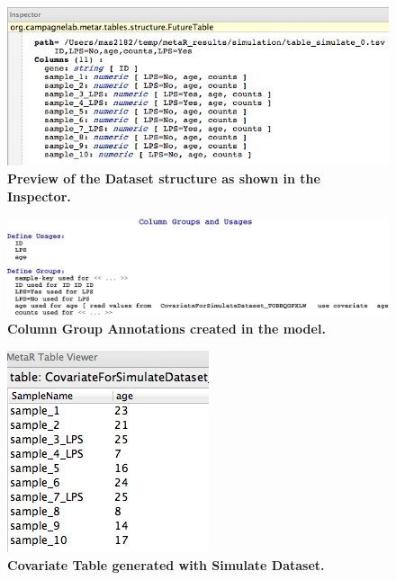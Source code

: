 \begin{figure}[h!tbp]
  \centering
  \includegraphics[width=\figWidthWide]{figures/SimulateTableInspector.png}
\caption[SimulateDataset Inspector.]{\textbf{Preview of the Dataset structure as shown in the Inspector.}}
\label{fig:SimulateDatasetInspector}
\end{figure}

\begin{figure}[h!tbp]
  \centering
  \includegraphics[width=\figWidthWide]{figures/SimulateGroups.pdf}
\caption[Column Group Annotations.]{\textbf{Column Group Annotations created in the model.}}
\label{fig:SimulateGroups}
\end{figure}

\begin{figure}[h!tbp]
  \centering
  \includegraphics[width=\figWidthNarrow]{figures/SimulateCovariateTableInspector.png}
\caption[SimulateCovariateTableInspector.]{\textbf{Covariate Table generated with Simulate Dataset.}}
\label{fig:SimulateCovariateTableInspector}
\end{figure}


